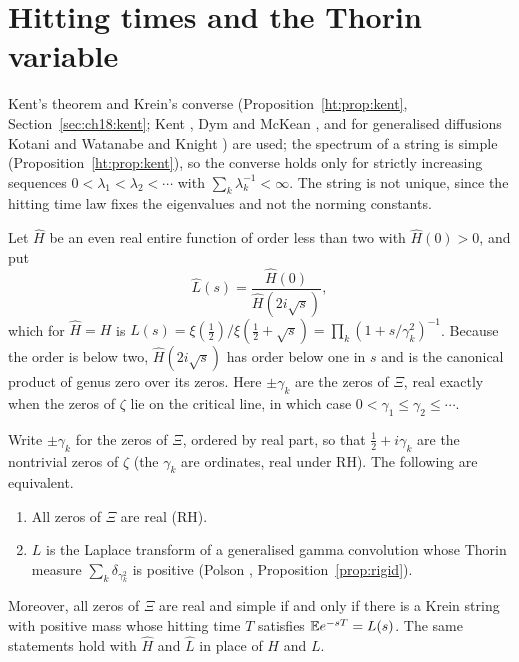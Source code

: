 \section{Hitting times and the Thorin variable}\label{ev:sec:kent}

Kent's theorem and Krein's converse (Proposition~\ref{ht:prop:kent}, Section~\ref{sec:ch18:kent}; Kent \cite{Kent80}, Dym and McKean \cite{DymMcKean76}, and for generalised diffusions Kotani and Watanabe \cite{KotaniWatanabe82} and Knight \cite{Knight81}) are used; the spectrum of a string is simple (Proposition~\ref{ht:prop:kent}), so the converse holds only for strictly increasing sequences $0<\lambda_1<\lambda_2<\cdots$ with $\sum_k\lambda_k^{-1}<\infty$. The string is not unique, since the hitting time law fixes the eigenvalues and not the norming constants.

Let $\widehat H$ be an even real entire function of order less than two with $\widehat H(0)>0$, and put
\[
\widehat L(s) = \frac{\widehat H(0)}{\widehat H(2i\sqrt s)} ,
\]
which for $\widehat H=H$ is $L(s)=\xi(\tfrac12)/\xi(\tfrac12+\sqrt s)=\prod_k(1+s/\gamma_k^2)^{-1}$. Because the order is below two, $\widehat H(2i\sqrt s)$ has order below one in $s$ and is the canonical product of genus zero over its zeros. Here $\pm\gamma_k$ are the zeros of $\Xi$, real exactly when the zeros of $\zeta$ lie on the critical line, in which case $0<\gamma_1\le\gamma_2\le\cdots$.

\begin{corollary}\label{ev:cor:rh}
Write $\pm\gamma_k$ for the zeros of $\Xi$, ordered by real part, so that $\frac12+i\gamma_k$ are the nontrivial zeros of $\zeta$ (the $\gamma_k$ are ordinates, real under RH). The following are equivalent.
\begin{enumerate}
\item All zeros of $\Xi$ are real (RH).
\item $L$ is the Laplace transform of a generalised gamma convolution whose Thorin measure $\sum_k\delta_{\gamma_k^2}$ is positive (Polson \cite{P17}, Proposition~\ref{prop:rigid}).
\end{enumerate}
Moreover, all zeros of $\Xi$ are real and simple if and only if there is a Krein string with positive mass whose hitting time $T$ satisfies $\mathbb{E} e^{-sT}=L(s)$. The same statements hold with $\widehat H$ and $\widehat L$ in place of $H$ and $L$.
\end{corollary}

